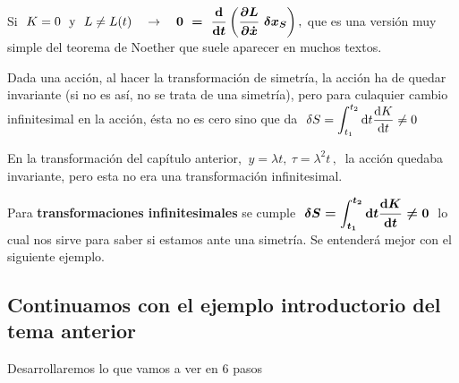 \vspace{10mm}
Si $\ K=0 \ \text{ y } \ L\neq L(t) \quad \to \quad \boldsymbol{0 \ = \ \displaystyle \dv{t} \left( \pdv{L}{\dot x} \ \var x_S \right)} \, , $ que es una versión muy simple del teorema de Noether que suele aparecer en muchos textos.

Dada una acción, al hacer la transformación de simetría, la acción ha de quedar invariante (si no es así, no se trata de una simetría), pero para culaquier cambio infinitesimal en la acción, ésta no es cero sino que da $\ \var S=\displaystyle \int_{t_1}^{t_2} \dd t \dv{K}{t} \neq 0$

En la transformación del capítulo anterior, $\ y=\lambda t,\ \tau=\lambda^2t\, , \  $ la acción quedaba invariante, pero esta no era una transformación infinitesimal.

Para \textbf{transformaciones infinitesimales} se cumple $\ \boldsymbol{ \var S=\displaystyle \int_{t_1}^{t_2} \dd t \dv{K}{t} \neq 0} \ $ lo cual nos sirve para saber si estamos ante una simetría. Se entenderá mejor con el siguiente ejemplo.

\vspace{10mm}
\subsection{Continuamos con el ejemplo introductorio del tema anterior}
\vspace{0.5cm}

Desarrollaremos lo que vamos a ver en 6 pasos

